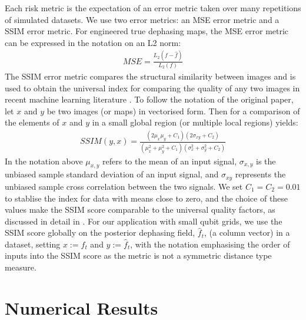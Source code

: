 Each risk metric is the expectation of an error metric taken over many repetitions of simulated datasets. We use two error metrics:  an MSE error metric and a SSIM error metric. For engineered true dephasing maps, the MSE error metric can be expressed in the notation on an L2 norm:
\begin{align}
	MSE = \frac{L_{2}(f - \hat{f})}{L_{2}(f)}
\end{align}
The SSIM error metric compares the structural similarity between images and is used to obtain the universal index for comparing the quality of any two images in recent machine learning literature \cite{wang2004image}. To follow the notation of the original paper, let $x$ and $y$ be two images (or maps) in vectorised form. Then for a comparison of the elements of $x$ and $y$ in a small global region (or multiple local regions) yields:
\begin{align}
	SSIM(y,x) = \frac{(2 \mu_x \mu_y + C_1)(2 \sigma_{xy} + C_2)}{(\mu_x^2  + \mu_y^2 + C_1)(\sigma_{x}^2 + \sigma_{y}^2 + C_2)}
\end{align} In the notation above $\mu_{x,y}$ refers to the mean of an input signal, $\sigma_{x,y}$ is the unbiased sample standard deviation of an input signal, and $\sigma_{xy}$ represents the unbiased sample cross correlation between the two signals. We set $C_1 = C_2 = 0.01$ to stablise the index for data with means close to zero, and the choice of these values make the SSIM score comparable to the universal quality factors, as discussed in detail in \cite{wang2004image}. For our application with small qubit grids, we use the SSIM score globally on the posterior dephasing field, $\hat{f}_t$, (a column vector) in a dataset, setting $x := f_t $ and $y := \hat{f}_t$, with the notation emphasising the order of inputs into the SSIM score as the metric is not a symmetric distance type measure. \\


\section{Numerical Results} \label{sec:results}

